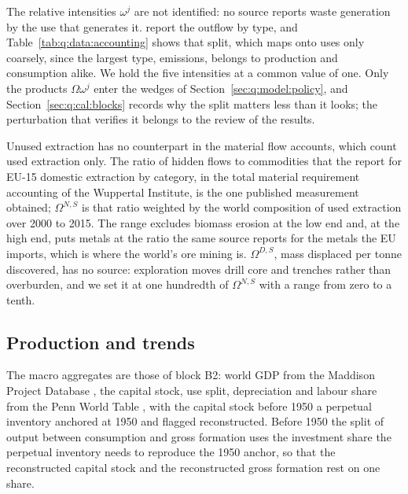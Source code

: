 The relative intensities $\omega^j$ are not identified: no source reports waste generation by the use that generates it. \textcite{krausmann2018} report the outflow by type, and Table~\ref{tab:q:data:accounting} shows that split, which maps onto uses only coarsely, since the largest type, emissions, belongs to production and consumption alike. We hold the five intensities at a common value of one. Only the products $\Omega\omega^j$ enter the wedges of Section~\ref{sec:q:model:policy}, and Section~\ref{sec:q:cal:blocks} records why the split matters less than it looks; the perturbation that verifies it belongs to the review of the results.

Unused extraction has no counterpart in the material flow accounts, which count used extraction only. The ratio of hidden flows to commodities that the \textcite{eea2001} report for EU-15 domestic extraction by category, in the total material requirement accounting of the Wuppertal Institute, is the one published measurement obtained; $\Omega^{N,S}$ is that ratio weighted by the world composition of used extraction over 2000 to 2015. The range excludes biomass erosion at the low end and, at the high end, puts metals at the ratio the same source reports for the metals the EU imports, which is where the world's ore mining is. $\Omega^{D,S}$, mass displaced per tonne discovered, has no source: exploration moves drill core and trenches rather than overburden, and we set it at one hundredth of $\Omega^{N,S}$ with a range from zero to a tenth.



\subsection{Production and trends}\label{sec:q:data:production}

The macro aggregates are those of block B2: world GDP from the Maddison Project Database \parencite{bolt2024}, the capital stock, use split, depreciation and labour share from the Penn World Table \parencite{feenstra2015}, with the capital stock before 1950 a perpetual inventory anchored at 1950 and flagged reconstructed. Before 1950 the split of output between consumption and gross formation uses the investment share the perpetual inventory needs to reproduce the 1950 anchor, so that the reconstructed capital stock and the reconstructed gross formation rest on one share.


